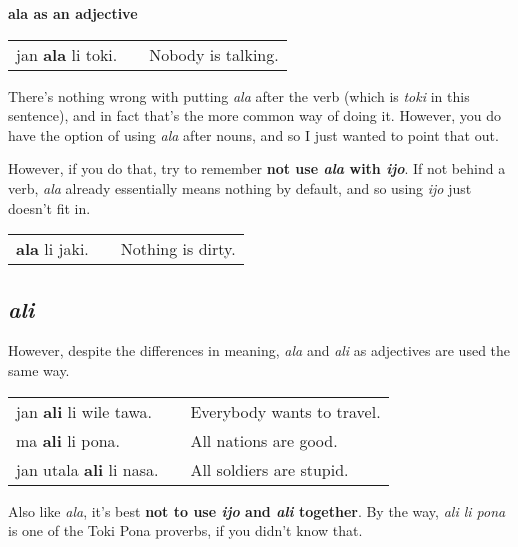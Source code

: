 \textbf{ala as an adjective}

\begin{supertabular}{p{5,5cm}|ll}
jan \textbf{ala} li toki. && Nobody is talking. \\
\end{supertabular} 

There's nothing wrong with putting \textit{ala} after the verb (which is \textit{toki} in this sentence), and in fact that's the more common way of doing it. 
However, you do have the option of using \textit{ala} after nouns, and so I just wanted to point that out. 

However, if you do that, try to remember \textbf{not use \textit{ala} with \textit{ijo}}. 
If not behind a verb, \textit{ala} already essentially means nothing by default, and so using \textit{ijo} just doesn't fit in.

\begin{supertabular}{p{5,5cm}|ll}
\textbf{ala} li jaki. && Nothing is dirty. \\
\end{supertabular} 
%
\subsection*{\textit{ali}}
%
However, despite the differences in meaning, \textit{ala} and \textit{ali} as adjectives are used the same way.

\begin{supertabular}{p{5,5cm}|ll}
jan \textbf{ali} li wile tawa. && Everybody wants to travel. \\
ma \textbf{ali} li pona. && All nations are good. \\
jan utala \textbf{ali} li nasa. && All soldiers are stupid.
\end{supertabular} 

Also like \textit{ala}, it's best \textbf{not to use \textit{ijo} and \textit{ali} together}. 
By the way, \textit{ali li pona} is one of the Toki Pona proverbs, if you didn't know that.  
%
\newpage
{}
